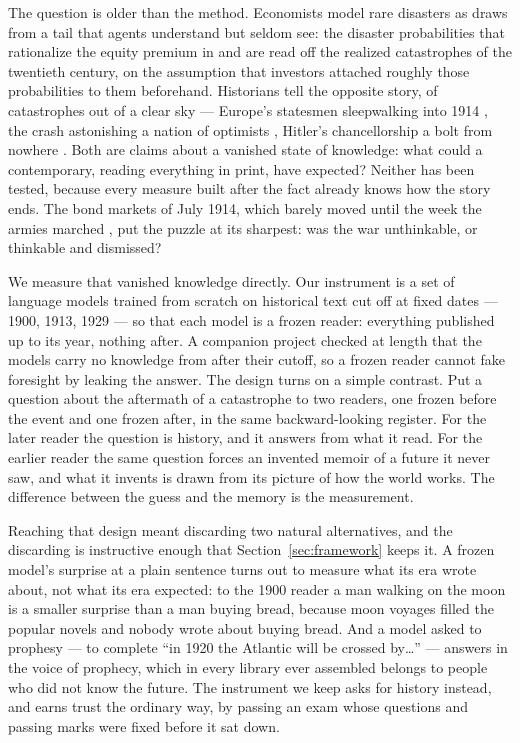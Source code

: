 \documentclass[11pt]{article}
\begin{document}
The question is older than the method. Economists model rare disasters as draws from a tail that agents
understand but seldom see: the disaster probabilities that rationalize the equity premium in
\citet{rietz1988} and \citet{barro2006} are read off the realized catastrophes of the twentieth century,
on the assumption that investors attached roughly those probabilities to them beforehand. Historians tell
the opposite story, of catastrophes out of a clear sky --- Europe's statesmen sleepwalking into 1914
\citep{clark2012}, the crash astonishing a nation of optimists \citep{galbraith1955,fisher1930}, Hitler's
chancellorship a bolt from nowhere \citep{turner1996}. Both are claims about a vanished state of knowledge:
what could a contemporary, reading everything in print, have expected? Neither has been tested, because
every measure built after the fact already knows how the story ends. The bond markets of July 1914, which
barely moved until the week the armies marched \citep{ferguson2006}, put the puzzle at its sharpest: was
the war unthinkable, or thinkable and dismissed?

We measure that vanished knowledge directly. Our instrument is a set of language models trained from
scratch on historical text cut off at fixed dates --- 1900, 1913, 1929 --- so that each model is a frozen
reader: everything published up to its year, nothing after. A companion project checked at length that the
models carry no knowledge from after their cutoff, so a frozen reader cannot fake foresight by leaking the
answer. The design turns on a simple contrast. Put a question about the aftermath of a catastrophe to two
readers, one frozen before the event and one frozen after, in the same backward-looking register. For the
later reader the question is history, and it answers from what it read. For the earlier reader the same
question forces an invented memoir of a future it never saw, and what it invents is drawn from its picture
of how the world works. The difference between the guess and the memory is the measurement.

Reaching that design meant discarding two natural alternatives, and the discarding is instructive enough
that Section~\ref{sec:framework} keeps it. A frozen model's surprise at a plain sentence turns out to
measure what its era wrote about, not what its era expected: to the 1900 reader a man walking on the moon
is a smaller surprise than a man buying bread, because moon voyages filled the popular novels and nobody
wrote about buying bread. And a model asked to prophesy --- to complete ``in 1920 the Atlantic will be
crossed by\ldots'' --- answers in the voice of prophecy, which in every library ever assembled belongs to
people who did not know the future. The instrument we keep asks for history instead, and earns trust the
ordinary way, by passing an exam whose questions and passing marks were fixed before it sat down.
\end{document}
